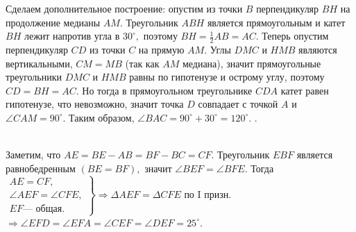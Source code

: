 \documentclass[12pt]{article}
\begin{document}
Сделаем дополнительное построение: опустим из точки $B$ перпендикуляр $BH$ на продолжение медианы $AM.$ Треугольник $ABH$ является прямоугольным и катет $BH$ лежит напротив угла в $30^\circ,$ поэтому $BH=\frac{1}{2}AB=AC.$ Теперь опустим перпендикуляр $CD$ из точки $C$ на прямую $AM.$ Углы $DMC$ и $HMB$ являются вертикальными, $CM=MB$ (так как $AM$ медиана), значит прямоугольные треугольники $DMC$ и $HMB$ равны по гипотенузе и острому углу, поэтому $CD=BH=AC.$ Но тогда в прямоугольном треугольнике $CDA$ катет равен гипотенузе, что невозможно, значит точка $D$ совпадает с точкой $A$ и $\angle CAM=90^\circ.$ Таким образом, $\angle BAC=90^\circ+30^\circ=120^\circ.$\newpage
{}. \begin{figure}[ht!]
\end{figure}\\
Заметим, что $AE=BE-AB=BF-BC=CF.$ Треугольник $EBF$ является равнобедренным $(BE=BF),$ значит $\angle BEF=\angle BFE.$ Тогда
$\left.\begin{array}{l}AE=CF,\\
\angle AEF=\angle CFE,\\
EF\text{--- общая.}  \end{array}\right\}\Rightarrow \Delta AEF=\Delta CFE\text{ по I призн.}$\\$\Rightarrow \angle EFD=\angle EFA=\angle CEF=\angle DEF=25^\circ.$\\
\end{document}
